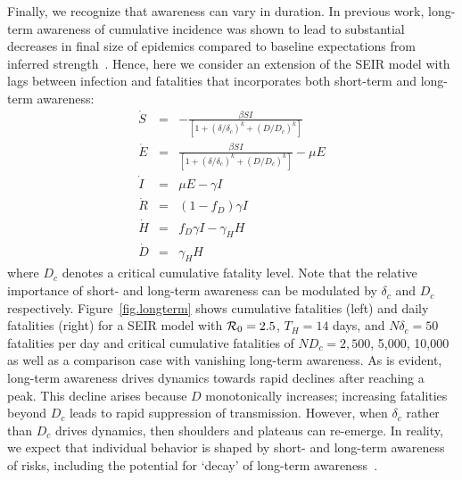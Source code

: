 Finally, we recognize that awareness can vary in duration.  In previous
work, long-term awareness of cumulative incidence
was shown to lead to substantial decreases
in final size of epidemics compared
to baseline expectations from inferred 
strength~\citep{eksin2019systematic}. Hence, 
here we consider an extension of the SEIR model
with lags between infection and fatalities that incorporates
both short-term and long-term awareness:
\begin{eqnarray}
\dot{S} &=& -\frac{\beta SI}{\left[1+\left(\delta/\delta_c\right)^{k}+\left(D/D_c\right)^k\right]}\\
\dot{E} &=& \frac{\beta SI}{\left[1+\left(\delta/\delta_c\right)^{k}+\left(D/D_c\right)^k\right]}-\mu E\\
\dot{I} &=& \mu E-\gamma I \\
\dot{R} &=& (1-f_D)\gamma I\\
\dot{H} &=& f_D\gamma I - \gamma_H H\\
\dot{D} &=& \gamma_H H
\end{eqnarray}
where $D_c$ denotes a critical cumulative fatality level. 
Note that the relative importance of short- and long-term
awareness can be modulated by $\delta_c$ and $D_c$ respectively.
Figure~\ref{fig.longterm} shows cumulative fatalities (left)
and daily fatalities (right)
for a SEIR model with ${\cal{R}}_0=2.5$, $T_H=14$ days, and $N\delta_c=50$ 
fatalities per day and critical cumulative fatalities of
$ND_c=2,500$, 5,000, 10,000 as well as a comparison case with vanishing
long-term awareness. As is evident, 
long-term awareness drives dynamics towards rapid declines
after reaching a peak. This decline arises because
$D$ monotonically increases;
increasing fatalities beyond $D_c$ leads to rapid suppression
of transmission.  However, when $\delta_c$ rather than
$D_c$ drives dynamics, then shoulders and plateaus can re-emerge.
In reality, we expect that individual
behavior is shaped by short- and long-term awareness of risks, including
the potential for `decay' of long-term awareness~\citep{funk2009spread,funk2010modelling}.

